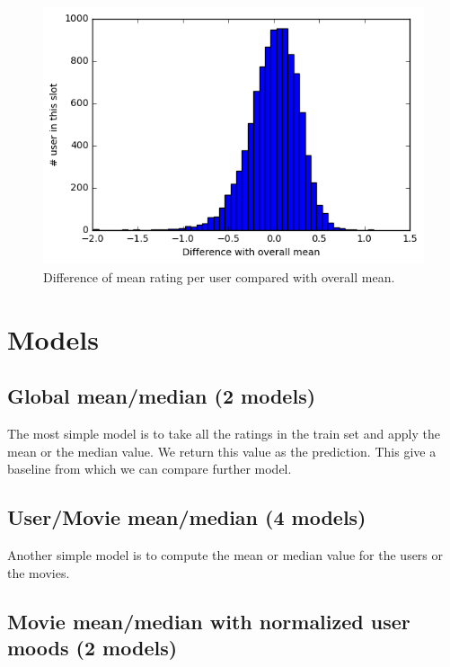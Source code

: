 \documentclass[10pt,conference,compsocconf]{IEEEtran}
\begin{document}
\begin{figure}[htbp] %
  \centering
  \includegraphics[width=\columnwidth]{img/Deviation_mean}
  \caption{Difference of mean rating per user compared with overall mean.}
  \vspace{-3mm}
  \label{mood}
\end{figure}

\section{Models}

\subsection{Global mean/median (2 models)}

The most simple model is to take all the ratings in the train set and apply the mean or the median value. We return this value as the prediction. This give a baseline from which we can compare further model.

\subsection{User/Movie mean/median (4 models)}

Another simple model is to compute the mean or median value for the users or the movies.

\subsection{Movie mean/median with normalized user moods (2 models)}
\end{document}
